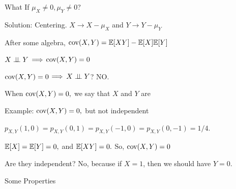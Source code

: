 \documentclass[handout,fleqn,aspectratio=169]{beamer}
\begin{document}
\begin{frame}{What If $\mu_X \neq 0, \mu_Y \neq 0$?}

\plitemsep 0.1in

\bci 

\item<2-> Solution: Centering. $X \rightarrow X - \mu_X$ and $Y \rightarrow Y-\mu_Y$

\item<4-> After some algebra, $\text{cov}( X,Y ) = \mathbb{E}[ XY ] - \mathbb{E}[ X ]\mathbb{E}[ Y ]$

\item<5-> $X \perp \!\!\! \perp Y$ $\Longrightarrow$ $\text{cov}( X,Y )=0$

\item<6-> $\text{cov}( X,Y )=0$ $\Longrightarrow$ $X \perp \!\!\! \perp Y$? NO.

\item<7-> When $\text{cov}( X,Y )=0,$ we say that $X$ and $Y$ are 

\eci

\end{frame}

\begin{frame}{Example: $\text{cov}( X,Y )=0,$ but not independent}

\plitemsep 0.1in

\bci 

\item $p_{X,Y}(1,0) = p_{X,Y}(0,1) = p_{X,Y}(-1,0) = p_{X,Y}(0,-1) = 1/4.$

\item<2-> $\mathbb{E}[ X ] = \mathbb{E}[ Y ]=0,$ and $\mathbb{E}[ XY ]=0.$ So, $\text{cov}( X,Y )=0$

\item<3-> Are they independent? No, because if $X=1$, then we should have $Y=0.$

\eci
\centering
{}
\end{frame}

\begin{frame}{Some Properties}

\plitemsep 0.07in

\vspace{-0.3in}
\bci []

\item<2-> 

\item<3-> 

\item<4->  

\item<5-> 
\eci

\end{frame}
\end{document}
